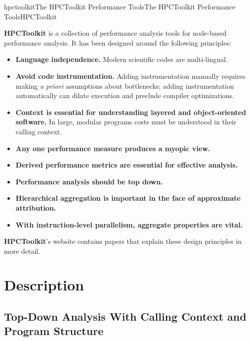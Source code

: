 \documentclass[english]{article}
\begin{document}
\begin{Name}{1}{hpctoolkit}{The HPCToolkit Performance Tools}{The HPCToolkit Performance Tools}{HPCToolkit}

\textbf{HPCToolkit} is a collection of performance analysis tools for node-based performance analysis.
It has been designed around the following principles:
\begin{itemize}
\item \textbf{Language independence.} Modern scientific codes are multi-lingual.
\item \textbf{Avoid code instrumentation.} Adding instrumentation manually requires making \emph{a priori} assumptions about bottlenecks; adding instrumentation automatically can dilate execution and preclude compiler optimizations.
\item \textbf{Context is essential for understanding layered and object-oriented software.} In large, modular programs costs must be understood in their calling context.
\item \textbf{Any one performance measure produces a myopic view.}
\item \textbf{Derived performance metrics are essential for effective analysis.}
\item \textbf{Performance analysis should be top down.}
\item \textbf{Hierarchical aggregation is important in the face of approximate attribution.} 
\item \textbf{With instruction-level parallelism, aggregate properties are vital.}
\end{itemize}

\textbf{HPCToolkit}'s website contains papers that explain these design principles in more detail.

\end{Name}

\section{Description}

\subsection{Top-Down Analysis With Calling Context and Program Structure}
\end{document}
